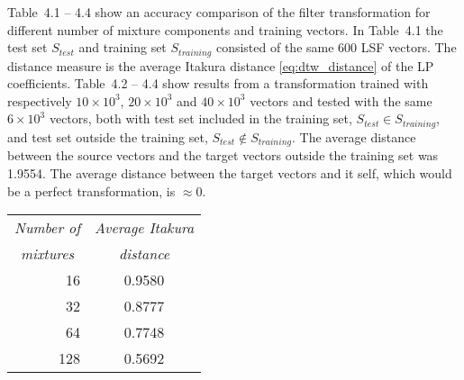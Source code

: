 \clearpage
Table~4.1 -- 4.4 show an accuracy comparison of the filter transformation for different number of mixture components and training vectors. In Table~4.1 the test set $S_{test}$ and training set $S_{training}$ consisted of the same 600 LSF vectors. The distance measure is the average Itakura distance \eqref{eq:dtw_distance} of the LP coefficients. Table~4.2 -- 4.4 show results from a transformation trained with respectively $10\times 10^3$, $20\times 10^3$ and $40\times 10^3$ vectors and tested with the same $6\times 10^3$ vectors, both with test set included in the training set, $S_{test} \in S_{training}$, and test set outside the training set, $S_{test} \notin S_{training}$. The average distance between the source vectors and the target vectors outside the training set was 1.9554. The average distance between the target vectors and it self, which would be a perfect transformation, is $\approx 0$.

\begin{table}[htbp]
	\begin{center}
		\begin{tabular}{rc}
			\toprule
			\multicolumn{1}{c}{\emph{Number of}} & \multicolumn{1}{c}{\emph{Average Itakura}}\\
						\multicolumn{1}{c}{\emph{mixtures}} & \multicolumn{1}{c}{\emph{distance}}\\
			\midrule
			16 & 0.9580\\
			32 & 0.8777\\
			64 & 0.7748\\
			128 & 0.5692\\
			\bottomrule			
		\end{tabular}		
	\end{center}
	\label{tab:accuracy_comparison_equal}	
\end{table}


